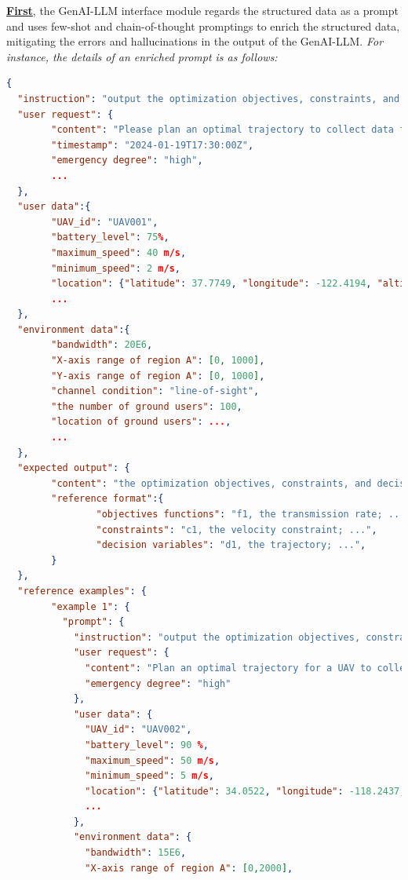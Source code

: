\documentclass[twoside,11pt]{reviewresponse}
\theoremstyle{plain}
\theoremstyle{plain}
\begin{document}
\par \textbf{\ul{First}}, the GenAI-LLM interface module regards the structured data as a prompt and uses few-shot and chain-of-thought promptings to enrich the structured data, mitigating the errors and hallucinations in the output of the GenAI-LLM. \textit{For instance, the details of an enriched prompt is as follows: }
\begin{lstlisting}[language=json]
{
  "instruction": "output the optimization objectives, constraints, and decision variables of an optimization problem based on the following data",
  "user request": {
        "content": "Please plan an optimal trajectory to collect data from devices in post-disaster area A, prioritizing the southeast corner",  
        "timestamp": "2024-01-19T17:30:00Z",
        "emergency degree": "high",
        ...
  },
  "user data":{
        "UAV_id": "UAV001",
        "battery_level": 75%,
        "maximum_speed": 40 m/s,
        "minimum_speed": 2 m/s,
        "location": {"latitude": 37.7749, "longitude": -122.4194, "altitude": 100},
        ... 
  },
  "environment data":{
        "bandwidth": 20E6,
        "X-axis range of region A": [0, 1000],
        "Y-axis range of region A": [0, 1000],
        "channel condition": "line-of-sight",
        "the number of ground users": 100,
        "location of ground users": ...,
        ... 
  },
  "expected output": {
        "content": "the optimization objectives, constraints, and decision variables of an optimization problem",
        "reference format":{
                "objectives functions": "f1, the transmission rate; ...",
                "constraints": "c1, the velocity constraint; ...",
                "decision variables": "d1, the trajectory; ...",
        }
  },
  "reference examples": {
        "example 1": {
          "prompt": {
            "instruction": "output the optimization objectives, constraints, and decision variables of an optimization problem based on the following data",
            "user request": {
              "content": "Plan an optimal trajectory for a UAV to collect data from devices in a disaster area, prioritizing the southeast corner.",
              "emergency degree": "high"
            },
            "user data": {
              "UAV_id": "UAV002",
              "battery_level": 90 %,
              "maximum_speed": 50 m/s,
              "minimum_speed": 5 m/s,
              "location": {"latitude": 34.0522, "longitude": -118.2437, "altitude":150 },
              ...
            },
            "environment data": {
              "bandwidth": 15E6,
              "X-axis range of region A": [0,2000],

\end{lstlisting}
\end{document}
